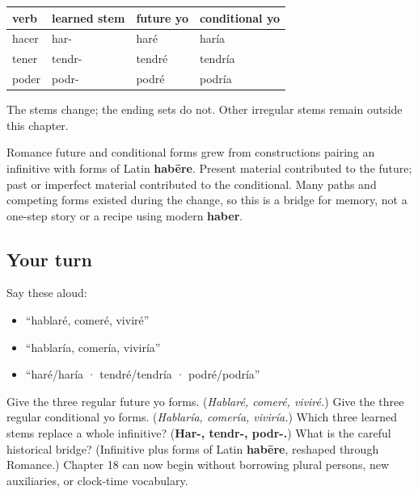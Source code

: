 \begin{grammarlens}[title={Grammar Lens: three learned stems}]
\noindent
\begin{tabularx}{\linewidth}{@{}>{\raggedright\arraybackslash}X>{\raggedright\arraybackslash}X>{\raggedright\arraybackslash}X>{\raggedright\arraybackslash}X@{}}
\toprule
\textbf{verb} & \textbf{learned stem} & \textbf{future yo} & \textbf{conditional yo} \\
\midrule
hacer & har- & haré & haría \\
tener & tendr- & tendré & tendría \\
poder & podr- & podré & podría \\
\bottomrule
\end{tabularx}

The stems change; the ending sets do not. Other irregular stems remain outside this chapter.
\end{grammarlens}

\begin{cousinweb}
Romance future and conditional forms grew from constructions pairing an infinitive with forms of Latin \textbf{habēre}. Present material contributed to the future; past or imperfect material contributed to the conditional. Many paths and competing forms existed during the change, so this is a bridge for memory, not a one-step story or a recipe using modern \textbf{haber}.
\end{cousinweb}

\subsection*{Your turn}
Say these aloud:

\begin{itemize}
\raggedright
  \item “hablaré, comeré, viviré”
  \item “hablaría, comería, viviría”
  \item “haré/haría · tendré/tendría · podré/podría”
\end{itemize}

\begin{tcolorbox}[breakable,colback=teal!4,colframe=teal!35!black,title={Before you move on}]
Give the three regular future yo forms. (\emph{Hablaré, comeré, viviré.}) Give the three regular conditional yo forms. (\emph{Hablaría, comería, viviría.}) Which three learned stems replace a whole infinitive? (\textbf{Har-, tendr-, podr-.}) What is the careful historical bridge? (Infinitive plus forms of Latin \textbf{habēre}, reshaped through Romance.) Chapter 18 can now begin without borrowing plural persons, new auxiliaries, or clock-time vocabulary.
\end{tcolorbox}
